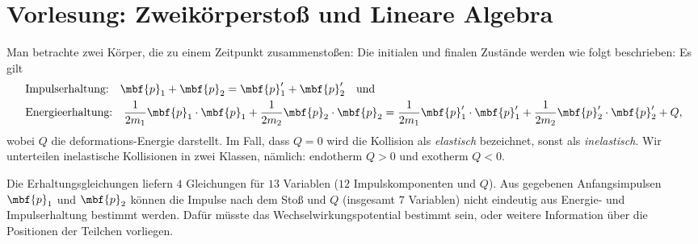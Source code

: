 
\section{Vorlesung: Zweikörperstoß und Lineare Algebra}

\begin{beispiel}[Zweikörperstoß]
Man betrachte zwei Körper, die zu einem Zeitpunkt zusammenstoßen: Die initialen und finalen Zustände werden wie folgt beschrieben:
\figbox
Es gilt 
\begin{equation}
  \begin{split}
    &\text{Impulserhaltung:}\quad \mbf{p}_1+\mbf{p}_2 = \mbf{p}_1'+\mbf{p}_2'\quad \text{und} \\
    &\text{Energieerhaltung:}\quad \frac{1}{2m_1}\mbf{p}_1\cdot \mbf{p}_1 +\frac{1}{2m_2}\mbf{p}_2\cdot \mbf{p}_2 = \frac{1}{2m_1}\mbf{p}_1'\cdot \mbf{p}_1' +\frac{1}{2m_2}\mbf{p}_2'\cdot \mbf{p}_2' + Q,
  \end{split}
\end{equation}
wobei $Q$ die deformations-Energie darstellt. Im Fall, dass $Q=0$ wird die Kollision als \emph{elastisch} bezeichnet, sonst als \emph{inelastisch}. Wir unterteilen inelastische Kollisionen in zwei Klassen, nämlich: endotherm $Q>0$ und exotherm $Q<0$.

Die Erhaltungsgleichungen liefern $4$ Gleichungen für $13$ Variablen ($12$ Impulskomponenten und $Q$). Aus gegebenen Anfangsimpulsen $\mbf{p}_1$ und $\mbf{p}_2$ können die Impulse nach dem Stoß und $Q$ (insgesamt $7$ Variablen) nicht eindeutig aus Energie- und Impulserhaltung bestimmt werden. Dafür müsste das Wechselwirkungspotential bestimmt sein, oder weitere Information über die Positionen der Teilchen vorliegen.
\end{beispiel}

